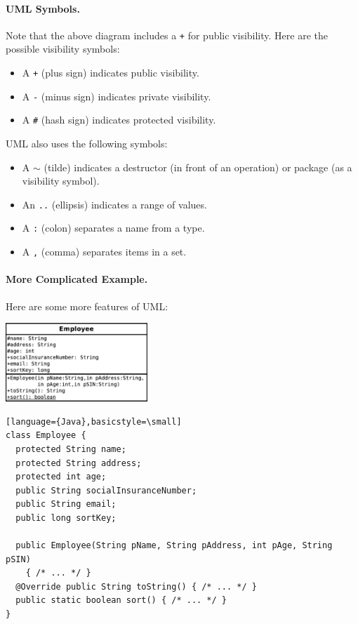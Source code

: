 \paragraph{UML Symbols.} Note that the above diagram includes a {\tt +}
for public visibility. Here are the possible visibility symbols:
\begin{itemize}
\item A {\tt +} (plus sign) indicates public visibility.
\item A {\tt -} (minus sign) indicates private visibility.
\item A {\tt \#} (hash sign) indicates protected visibility.
\end{itemize}

UML also uses the following symbols:
\begin{itemize}
\item A {\tt $\sim$} (tilde) indicates a destructor (in front of an operation) 
or package (as a visibility symbol).
\item An {\tt ..} (ellipsis) indicates a range of values.
\item A {\tt :} (colon) separates a name from a type.
\item A {\tt ,} (comma) separates items in a set.
\end{itemize}

\paragraph{More Complicated Example.} Here are some more features of UML:

\begin{center}
\includegraphics[height=8em]{images/Employee.pdf}
\end{center}

\begin{verbatim}[language={Java},basicstyle=\small]
class Employee {
  protected String name;
  protected String address;
  protected int age;
  public String socialInsuranceNumber;
  public String email;
  public long sortKey;

  public Employee(String pName, String pAddress, int pAge, String pSIN) 
    { /* ... */ }
  @Override public String toString() { /* ... */ }
  public static boolean sort() { /* ... */ }
}
\end{verbatim}

